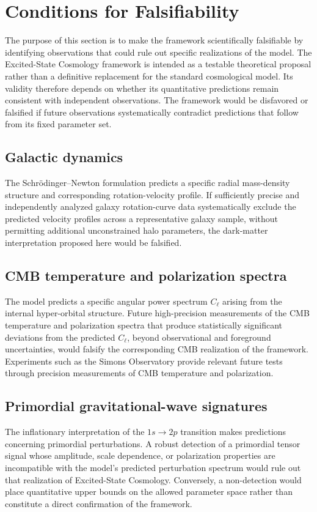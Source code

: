 \chapter{Conditions for Falsifiability}

The purpose of this section is to make the framework scientifically falsifiable by identifying observations that could rule out specific realizations of the model. The Excited-State Cosmology framework is intended as a testable theoretical proposal rather than a definitive replacement for the standard cosmological model. Its validity therefore depends on whether its quantitative predictions remain consistent with independent observations. The framework would be disfavored or falsified if future observations systematically contradict predictions that follow from its fixed parameter set.

\section{Galactic dynamics}
The Schr\"{o}dinger--Newton formulation predicts a specific radial mass-density structure and corresponding rotation-velocity profile. If sufficiently precise and independently analyzed galaxy rotation-curve data systematically exclude the predicted velocity profiles across a representative galaxy sample, without permitting additional unconstrained halo parameters, the dark-matter interpretation proposed here would be falsified.

\section{CMB temperature and polarization spectra}
The model predicts a specific angular power spectrum $C_\ell$ arising from the internal hyper-orbital structure. Future high-precision measurements of the CMB temperature and polarization spectra that produce statistically significant deviations from the predicted $C_\ell$, beyond observational and foreground uncertainties, would falsify the corresponding CMB realization of the framework. Experiments such as the Simons Observatory provide relevant future tests through precision measurements of CMB temperature and polarization.

\section{Primordial gravitational-wave signatures}
The inflationary interpretation of the $1s\rightarrow2p$ transition makes predictions concerning primordial perturbations. A robust detection of a primordial tensor signal whose amplitude, scale dependence, or polarization properties are incompatible with the model's predicted perturbation spectrum would rule out that realization of Excited-State Cosmology. Conversely, a non-detection would place quantitative upper bounds on the allowed parameter space rather than constitute a direct confirmation of the framework.

